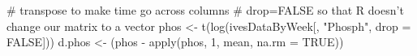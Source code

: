 \begin{Schunk}
\begin{Sinput}
 # transpose to make time go across columns
 # drop=FALSE so that R doesn't change our matrix to a vector
 phos <- t(log(ivesDataByWeek[, "Phosph", drop = FALSE]))
 d.phos <- (phos - apply(phos, 1, mean, na.rm = TRUE))
\end{Sinput}
\end{Schunk}
